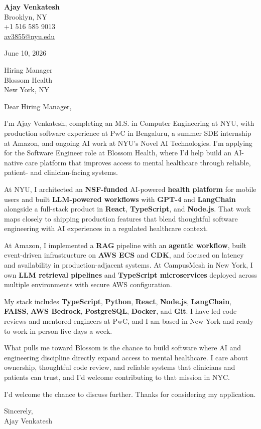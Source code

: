 \documentclass[letterpaper,11pt]{article}
\begin{document}
\begin{flushleft}
\textbf{\large Ajay Venkatesh} \\
Brooklyn, NY \\
+1 516 585 9013 \\
\href{mailto:av3855@nyu.edu}{av3855@nyu.edu}
\end{flushleft}
\vspace{10pt}
June 10, 2026
\vspace{6pt}

Hiring Manager \\
Blossom Health \\
New York, NY

\vspace{10pt}

Dear Hiring Manager,

I'm Ajay Venkatesh, completing an M.S. in Computer Engineering at NYU, with production software experience at PwC in Bengaluru, a summer SDE internship at Amazon, and ongoing AI work at NYU's Novel AI Technologies. I'm applying for the Software Engineer role at Blossom Health, where I'd help build an AI-native care platform that improves access to mental healthcare through reliable, patient- and clinician-facing systems.

At NYU, I architected an \textbf{NSF-funded} AI-powered \textbf{health platform} for mobile users and built \textbf{LLM-powered workflows} with \textbf{GPT-4} and \textbf{LangChain} alongside a full-stack product in \textbf{React}, \textbf{TypeScript}, and \textbf{Node.js}. That work maps closely to shipping production features that blend thoughtful software engineering with AI experiences in a regulated healthcare context.

At Amazon, I implemented a \textbf{RAG} pipeline with an \textbf{agentic workflow}, built event-driven infrastructure on \textbf{AWS ECS} and \textbf{CDK}, and focused on latency and availability in production-adjacent systems. At CampusMesh in New York, I own \textbf{LLM retrieval pipelines} and \textbf{TypeScript microservices} deployed across multiple environments with secure AWS configuration.

My stack includes \textbf{TypeScript}, \textbf{Python}, \textbf{React}, \textbf{Node.js}, \textbf{LangChain}, \textbf{FAISS}, \textbf{AWS Bedrock}, \textbf{PostgreSQL}, \textbf{Docker}, and \textbf{Git}. I have led code reviews and mentored engineers at PwC, and I am based in New York and ready to work in person five days a week.

What pulls me toward Blossom is the chance to build software where AI and engineering discipline directly expand access to mental healthcare. I care about ownership, thoughtful code review, and reliable systems that clinicians and patients can trust, and I'd welcome contributing to that mission in NYC.

I'd welcome the chance to discuss further. Thanks for considering my application.

\vspace{12pt}
Sincerely, \\
Ajay Venkatesh
\end{document}
